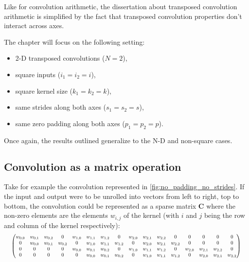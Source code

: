 Like for convolution arithmetic, the dissertation about transposed convolution
arithmetic is simplified by the fact that transposed convolution properties
don't interact across axes.

The chapter will focus on the following setting:

\begin{itemize}
    \item 2-D transposed convolutions ($N = 2$),
    \item square inputs ($i_1 = i_2 = i$),
    \item square kernel size ($k_1 = k_2 = k$),
    \item same strides along both axes ($s_1 = s_2 = s$),
    \item same zero padding along both axes ($p_1 = p_2 = p$).
\end{itemize}

\noindent Once again, the results outlined generalize to the N-D and non-square
cases.

\subsection{Convolution as a matrix operation}

Take for example the convolution represented in
\autoref{fig:no_padding_no_strides}. If the input and output were to be unrolled
into vectors from left to right, top to bottom, the convolution could be
represented as a sparse matrix $\mathbf{C}$ where the non-zero elements are the
elements $w_{i,j}$ of the kernel (with $i$ and $j$ being the row and column of
the kernel respectively):
\begin{equation*}
\setcounter{MaxMatrixCols}{20}
\resizebox{.98\hsize}{!}{$%
    \begin{pmatrix}%
    w_{0,0} & w_{0,1} & w_{0,2} & 0       & w_{1,0} & w_{1,1} & w_{1,2} & 0       &
    w_{2,0} & w_{2,1} & w_{2,2} & 0       & 0       & 0       & 0       & 0       \\
    0       & w_{0,0} & w_{0,1} & w_{0,2} & 0       & w_{1,0} & w_{1,1} & w_{1,2} &
    0       & w_{2,0} & w_{2,1} & w_{2,2} & 0       & 0       & 0       & 0       \\
    0       & 0       & 0       & 0       & w_{0,0} & w_{0,1} & w_{0,2} & 0       &
    w_{1,0} & w_{1,1} & w_{1,2} & 0       & w_{2,0} & w_{2,1} & w_{2,2} & 0       \\
    0       & 0       & 0       & 0       & 0       & w_{0,0} & w_{0,1} & w_{0,2} &
    0       & w_{1,0} & w_{1,1} & w_{1,2} & 0       & w_{2,0} & w_{2,1} & w_{2,2} \\
    \end{pmatrix}$}
\end{equation*}

